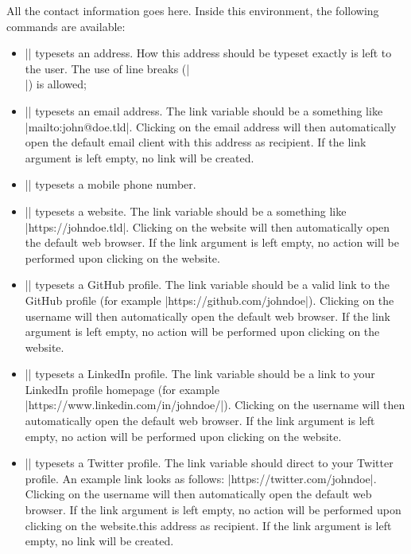 \documentclass{ltxdoc}
\begin{document}
  All the contact information goes here. Inside this environment, the following commands are available: 
  \begin{itemize}
    \item \DescribeMacro{\cvContactAddress} || typesets an address. How this address should be typeset exactly is left to the user. The use of line breaks (|\\|) is allowed;
    \item \DescribeMacro{\cvContactEmail} || typesets an email address. The link variable should be a something like |mailto:john@doe.tld|. Clicking on the email address will then automatically open the default email client with this address as recipient. If the link argument is left empty, no link will be created. 
    \item \DescribeMacro{\cvContactPhone} || typesets a mobile phone number.
    \item \DescribeMacro{\cvContactWebsite} || typesets a website. The link variable should be a something like |https://johndoe.tld|. Clicking on the website will then automatically open the default web browser. If the link argument is left empty, no action will be performed upon clicking on the website.
    \item \DescribeMacro{\cvContactGithub} || typesets a GitHub profile. The link variable should be a valid link to the GitHub profile (for example |https://github.com/johndoe|). Clicking on the username will then automatically open the default web browser. If the link argument is left empty, no action will be performed upon clicking on the website.
    \item \DescribeMacro{\cvContactLinkedin} || typesets a LinkedIn profile. The link variable should be a link to your LinkedIn profile homepage (for example |https://www.linkedin.com/in/johndoe/|). Clicking on the username will then automatically open the default web browser. If the link argument is left empty, no action will be performed upon clicking on the website. 
    \item \DescribeMacro{\cvContactTwitter} || typesets a Twitter profile. The link variable should direct to your Twitter profile. An example link looks as follows: |https://twitter.com/johndoe|. Clicking on the username will then automatically open the default web browser. If the link argument is left empty, no action will be performed upon clicking on the website.this address as recipient. If the link argument is left empty, no link will be created. 

\end{itemize}
\end{document}

